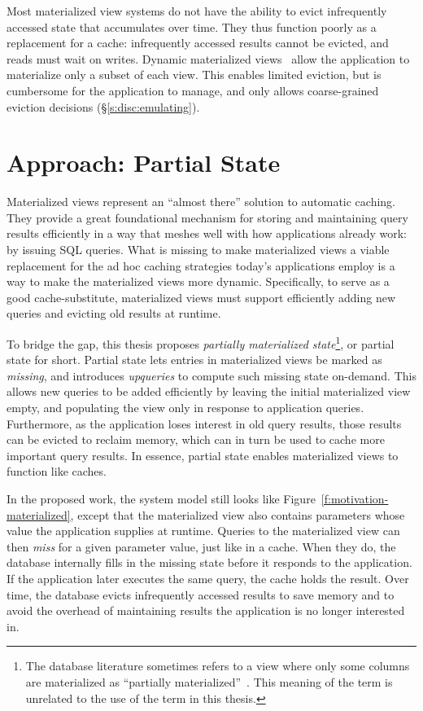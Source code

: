 Most materialized view systems do not have the ability to evict infrequently
accessed state that accumulates over time. They thus function poorly as a
replacement for a cache: infrequently accessed results cannot be evicted, and
reads must wait on writes. Dynamic materialized
views~\cite{dynamic-materialized-views, partially-materialized-views} allow the
application to materialize only a subset of each view. This enables limited
eviction, but is cumbersome for the application to manage, and only allows
coarse-grained eviction decisions (\S\ref{s:disc:emulating}).

\section{Approach: Partial State}
\label{s:approach}

Materialized views represent an ``almost there'' solution to automatic caching.
They provide a great foundational mechanism for storing and maintaining query
results efficiently in a way that meshes well with how applications already
work: by issuing SQL queries. What is missing to make materialized views a
viable replacement for the ad hoc caching strategies today's applications employ
is a way to make the materialized views more dynamic. Specifically, to serve as
a good cache-substitute, materialized views must support efficiently adding new
queries and evicting old results at runtime.

To bridge the gap, this thesis proposes \textit{partially materialized
state}\footnote{The database literature sometimes refers to a view where only
some columns are materialized as ``partially
materialized''~\cite{partially-materialized}. This meaning of the term is
unrelated to the use of the term in this thesis.}, or partial state for short.
Partial state lets entries in materialized views be marked as \textit{missing},
and introduces \textit{upqueries} to compute such missing state on-demand.
This allows new queries to be added efficiently by leaving the initial
materialized view empty, and populating the view only in response to application
queries. Furthermore, as the application loses interest in old query results,
those results can be evicted to reclaim memory, which can in turn be used to
cache more important query results. In essence, partial state enables
materialized views to function like caches.

In the proposed work, the system model still looks like
Figure~\vref{f:motivation-materialized}, except that the materialized view also
contains parameters whose value the application supplies at runtime. Queries to
the materialized view can then \emph{miss} for a given parameter value, just
like in a cache. When they do, the database internally fills in the missing
state before it responds to the application. If the application later executes
the same query, the cache holds the result. Over time, the database evicts
infrequently accessed results to save memory and to avoid the overhead of
maintaining results the application is no longer interested in.

